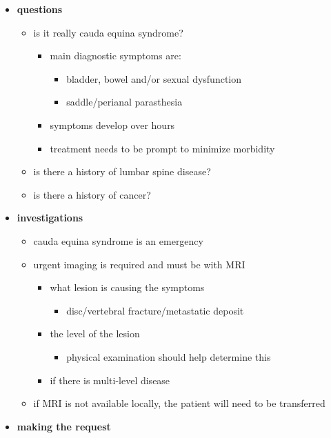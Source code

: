 \begin{itemize}
	\tightlist
	\item
	\textbf{questions}
	
	\begin{itemize}
		\tightlist
		\item
		is it really cauda equina syndrome?
		
		\begin{itemize}
			\tightlist
			\item
			main diagnostic symptoms are:
			
			\begin{itemize}
				\tightlist
				\item
				bladder, bowel and/or sexual dysfunction
				\item
				saddle/perianal parasthesia
			\end{itemize}
			\item
			symptoms develop over hours
			\item
			treatment needs to be prompt to minimize morbidity
		\end{itemize}
		\item
		is there a history of lumbar spine disease?
		\item
		is there a history of cancer?
	\end{itemize}
	\item
	\textbf{investigations}
	
	\begin{itemize}
		\tightlist
		\item
		cauda equina syndrome is an emergency
		\item
		urgent imaging is required and must be with MRI
		
		\begin{itemize}
			\tightlist
			\item
			what lesion is causing the symptoms
			
			\begin{itemize}
				\tightlist
				\item
				disc/vertebral fracture/metastatic deposit
			\end{itemize}
			\item
			the level of the lesion
			
			\begin{itemize}
				\tightlist
				\item
				physical examination should help determine this
			\end{itemize}
			\item
			if there is multi-level disease
		\end{itemize}
		\item
		if MRI is not available locally, the patient will need to be transferred
	\end{itemize}
	\item
	\textbf{making the request}
	

\end{itemize}
